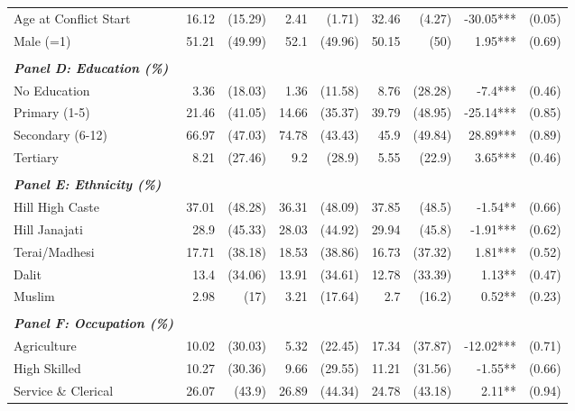 \begin{landscape}
\begin{table}[!h]
{\begin{tabular}[t]{lrrrrrrrr}
Age at Conflict Start & 16.12 & (15.29) & 2.41 & (1.71) & 32.46 & (4.27) & -30.05*** & (0.05)\\
\addlinespace
Male (=1) & 51.21 & (49.99) & 52.1 & (49.96) & 50.15 & (50) & 1.95*** & (0.69)\\
 &  &  &  &  &  &  &  & \\
\em{\textbf{Panel D: Education (\%)}} & \em{\textbf{}} & \em{\textbf{}} & \em{\textbf{}} & \em{\textbf{}} & \em{\textbf{}} & \em{\textbf{}} & \em{\textbf{}} & \em{\textbf{}}\\
No Education & 3.36 & (18.03) & 1.36 & (11.58) & 8.76 & (28.28) & -7.4*** & (0.46)\\
Primary (1-5) & 21.46 & (41.05) & 14.66 & (35.37) & 39.79 & (48.95) & -25.14*** & (0.85)\\
\addlinespace
Secondary (6-12) & 66.97 & (47.03) & 74.78 & (43.43) & 45.9 & (49.84) & 28.89*** & (0.89)\\
Tertiary & 8.21 & (27.46) & 9.2 & (28.9) & 5.55 & (22.9) & 3.65*** & (0.46)\\
 &  &  &  &  &  &  &  & \\
\em{\textbf{Panel E: Ethnicity (\%)}} & \em{\textbf{}} & \em{\textbf{}} & \em{\textbf{}} & \em{\textbf{}} & \em{\textbf{}} & \em{\textbf{}} & \em{\textbf{}} & \em{\textbf{}}\\
Hill High Caste & 37.01 & (48.28) & 36.31 & (48.09) & 37.85 & (48.5) & -1.54** & (0.66)\\
\addlinespace
Hill Janajati & 28.9 & (45.33) & 28.03 & (44.92) & 29.94 & (45.8) & -1.91*** & (0.62)\\
Terai/Madhesi & 17.71 & (38.18) & 18.53 & (38.86) & 16.73 & (37.32) & 1.81*** & (0.52)\\
Dalit & 13.4 & (34.06) & 13.91 & (34.61) & 12.78 & (33.39) & 1.13** & (0.47)\\
Muslim & 2.98 & (17) & 3.21 & (17.64) & 2.7 & (16.2) & 0.52** & (0.23)\\
 &  &  &  &  &  &  &  & \\
\addlinespace
\em{\textbf{Panel F: Occupation (\%)}} & \em{\textbf{}} & \em{\textbf{}} & \em{\textbf{}} & \em{\textbf{}} & \em{\textbf{}} & \em{\textbf{}} & \em{\textbf{}} & \em{\textbf{}}\\
Agriculture & 10.02 & (30.03) & 5.32 & (22.45) & 17.34 & (37.87) & -12.02*** & (0.71)\\
High Skilled & 10.27 & (30.36) & 9.66 & (29.55) & 11.21 & (31.56) & -1.55** & (0.66)\\
Service \& Clerical & 26.07 & (43.9) & 26.89 & (44.34) & 24.78 & (43.18) & 2.11** & (0.94)\\

\end{tabular}}
\end{table}
\end{landscape}
